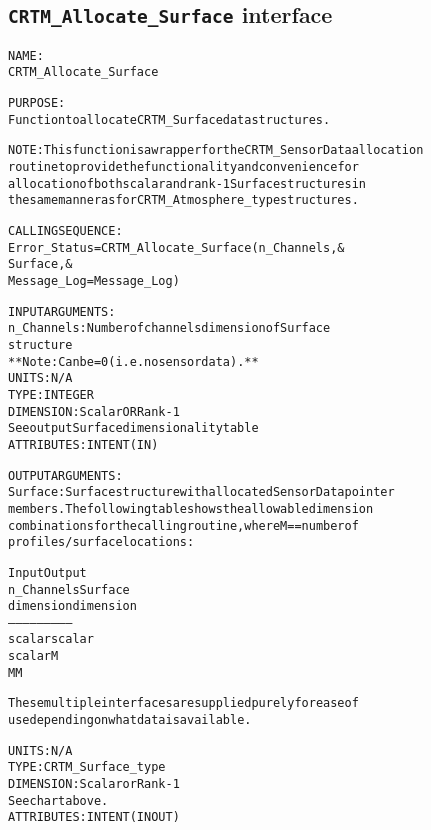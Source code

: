 \subsection{\texttt{CRTM\_Allocate\_Surface} interface}
  \label{sec:CRTM_Allocate_Surface_interface}
  \begin{alltt}
 
  NAME:
        CRTM_Allocate_Surface
  
  PURPOSE:
        Function to allocate CRTM_Surface data structures.
 
        NOTE: This function is a wrapper for the CRTM_SensorData allocation 
              routine to provide the functionality and convenience for
              allocation of both scalar and rank-1 Surface structures in
              the same manner as for CRTM_Atmosphere_type structures.
 
  CALLING SEQUENCE:
        Error_Status = CRTM_Allocate_Surface( n_Channels             , &
                                              Surface                , &
                                              Message_Log=Message_Log  )
 
  INPUT ARGUMENTS:
        n_Channels:   Number of channels dimension of Surface%SensorData
                      structure
                      ** Note: Can be = 0 (i.e. no sensor data). **
                      UNITS:      N/A
                      TYPE:       INTEGER
                      DIMENSION:  Scalar OR Rank-1
                                  See output Surface dimensionality table
                      ATTRIBUTES: INTENT(IN)
 
  OUTPUT ARGUMENTS:
        Surface:      Surface structure with allocated SensorData pointer
                      members. The following table shows the allowable dimension
                      combinations for the calling routine, where M == number of
                      profiles/surface locations:
 
                         Input       Output
                       n_Channels   Surface
                        dimension   dimension
                      --------------------------
                         scalar      scalar
                         scalar        M
                           M           M
 
                      These multiple interfaces are supplied purely for ease of
                      use depending on what data is available.
                      
                      UNITS:      N/A
                      TYPE:       CRTM_Surface_type
                      DIMENSION:  Scalar or Rank-1
                                  See chart above.
                      ATTRIBUTES: INTENT(IN OUT)
 

\end{alltt}
